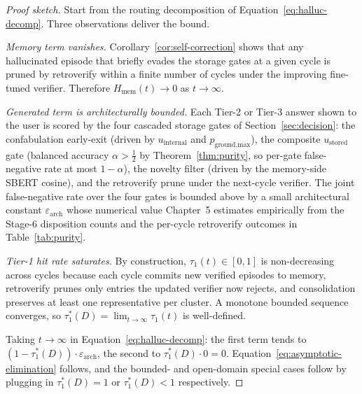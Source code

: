 \begin{proof}[Proof sketch]
Start from the routing decomposition of Equation~\ref{eq:halluc-decomp}. Three observations deliver the bound.

\emph{Memory term vanishes.} Corollary~\ref{cor:self-correction} shows that any hallucinated episode that briefly evades the storage gates at a given cycle is pruned by retroverify within a finite number of cycles under the improving fine-tuned verifier. Therefore $H_{\text{mem}}(t) \to 0$ as $t \to \infty$.

\emph{Generated term is architecturally bounded.} Each Tier-2 or Tier-3 answer shown to the user is scored by the four cascaded storage gates of Section~\ref{sec:decision}: the confabulation early-exit (driven by $u_{\text{internal}}$ and $p_{\text{ground,max}}$), the composite $u_{\text{stored}}$ gate (balanced accuracy $\alpha > \tfrac{1}{2}$ by Theorem~\ref{thm:purity}, so per-gate false-negative rate at most $1-\alpha$), the novelty filter (driven by the memory-side SBERT cosine), and the retroverify prune under the next-cycle verifier. The joint false-negative rate over the four gates is bounded above by a small architectural constant $\varepsilon_{\text{arch}}$ whose numerical value Chapter~5 estimates empirically from the Stage-6 disposition counts and the per-cycle retroverify outcomes in Table~\ref{tab:purity}.

\emph{Tier-1 hit rate saturates.} By construction, $\tau_{1}(t) \in [0, 1]$ is non-decreasing across cycles because each cycle commits new verified episodes to memory, retroverify prunes only entries the updated verifier now rejects, and consolidation preserves at least one representative per cluster. A monotone bounded sequence converges, so $\tau_{1}^{*}(D) = \lim_{t \to \infty} \tau_{1}(t)$ is well-defined.

Taking $t \to \infty$ in Equation~\ref{eq:halluc-decomp}: the first term tends to $(1 - \tau_{1}^{*}(D)) \cdot \varepsilon_{\text{arch}}$, the second to $\tau_{1}^{*}(D) \cdot 0 = 0$. Equation~\ref{eq:asymptotic-elimination} follows, and the bounded- and open-domain special cases follow by plugging in $\tau_{1}^{*}(D) = 1$ or $\tau_{1}^{*}(D) < 1$ respectively.
\end{proof}

